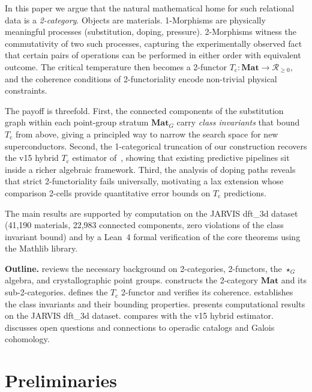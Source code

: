 \documentclass[12pt,a4paper]{article}
\theoremstyle{plain}
\theoremstyle{definition}
\theoremstyle{remark}
\newcommand{\Tc}{T_{\mathrm{c}}}
\newcommand{\Matl}{\mathbf{Mat}}
\newcommand{\MatlG}{\mathbf{Mat}_G}
\newcommand{\starG}{\star_G}
\begin{document}
In this paper we argue that the natural mathematical home for such relational
data is a \emph{2-category}.  Objects are materials.  1-Morphisms are
physically meaningful processes (substitution, doping, pressure).
2-Morphisms witness the commutativity of two such processes, capturing the
experimentally observed fact that certain pairs of operations can be performed
in either order with equivalent outcome.  The critical temperature then becomes
a 2-functor $\Tc \colon \Matl \to \mathscr{R}_{\geq 0}$, and the coherence
conditions of 2-functoriality encode non-trivial physical constraints.

The payoff is threefold.  First, the connected components of the substitution
graph within each point-group stratum $\MatlG$ carry \emph{class invariants}
that bound $\Tc$ from above, giving a principled way to narrow the search
space for new superconductors.  Second, the 1-categorical truncation of our
construction recovers the v15 hybrid $\Tc$ estimator of~\cite{placeholder_v15},
showing that existing predictive pipelines sit inside a richer algebraic
framework.  Third, the analysis of doping paths reveals that strict
2-functoriality fails universally, motivating a lax extension whose
comparison 2-cells provide quantitative error bounds on $\Tc$ predictions.

The main results are supported by computation on the JARVIS dft\_3d
dataset (41{,}190 materials, 22{,}983 connected components, zero
violations of the class invariant bound) and by a Lean~4 formal
verification of the core theorems using the Mathlib library.

\medskip
\noindent\textbf{Outline.}
 reviews the necessary background on 2-categories,
2-functors, the $\starG$ algebra, and crystallographic point groups.
 constructs the 2-category $\Matl$ and its sub-2-categories.
 defines the $\Tc$ 2-functor and verifies its coherence.
 establishes the class invariants and their bounding
properties.
 presents computational results on the JARVIS dft\_3d
dataset.
 compares with the v15 hybrid estimator.
 discusses open questions and connections to operadic
catalogs and Galois cohomology.

\section{Preliminaries}\label{sec:prelim}
\end{document}
